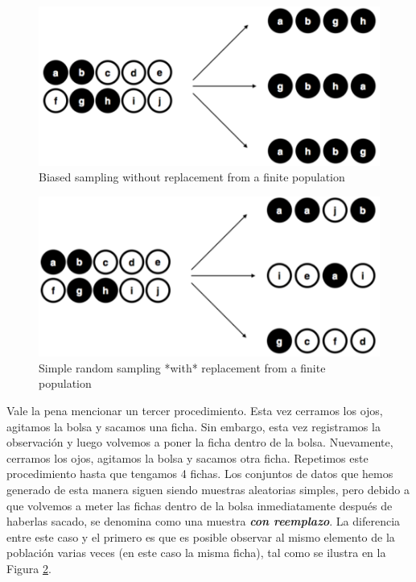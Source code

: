 \documentclass[spanish,]{book}
\begin{document}
\begin{figure}
\includegraphics[width=12.81in]{img/estimation/brs} \caption{Biased sampling without replacement from a finite population}\label{fig:brs}
\end{figure}

\begin{figure}
\includegraphics[width=12.94in]{img/estimation/srs2} \caption{Simple random sampling *with* replacement from a finite population}\label{fig:srs2}
\end{figure}

Vale la pena mencionar un tercer procedimiento. Esta vez cerramos los
ojos, agitamos la bolsa y sacamos una ficha. Sin embargo, esta vez
registramos la observación y luego volvemos a poner la ficha dentro de
la bolsa. Nuevamente, cerramos los ojos, agitamos la bolsa y sacamos
otra ficha. Repetimos este procedimiento hasta que tengamos 4 fichas.
Los conjuntos de datos que hemos generado de esta manera siguen siendo
muestras aleatorias simples, pero debido a que volvemos a meter las
fichas dentro de la bolsa inmediatamente después de haberlas sacado, se
denomina como una muestra \textbf{\emph{con reemplazo}}. La diferencia
entre este caso y el primero es que es posible observar al mismo
elemento de la población varias veces (en este caso la misma ficha), tal
como se ilustra en la Figura \ref{fig:srs2}.
\end{document}
